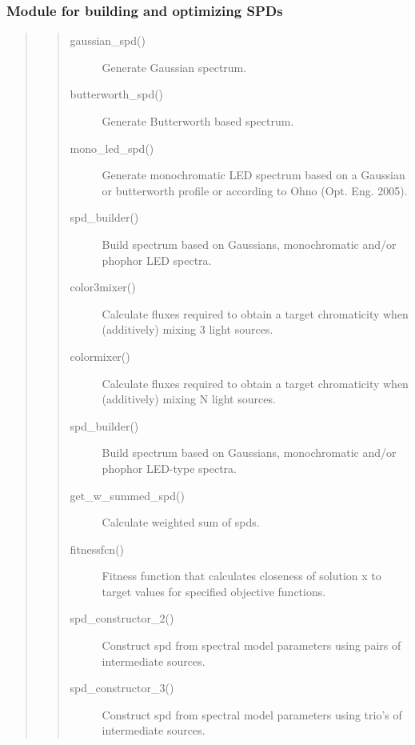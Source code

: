 \documentclass[letterpaper,10pt,english]{sphinxmanual}
\begin{document}
\subsubsection{Module for building and optimizing SPDs}
\label{\detokenize{toolboxes:module-for-building-and-optimizing-spds}}\begin{quote}
\begin{quote}\begin{description}
\item[{gaussian\_spd()}] \leavevmode
Generate Gaussian spectrum.

\item[{butterworth\_spd()}] \leavevmode
Generate Butterworth based spectrum.

\item[{mono\_led\_spd()}] \leavevmode
Generate monochromatic LED spectrum based on a Gaussian 
or butterworth profile or according to Ohno (Opt. Eng. 2005).

\item[{spd\_builder()}] \leavevmode
Build spectrum based on Gaussians, monochromatic 
and/or phophor LED spectra.

\item[{color3mixer()}] \leavevmode
Calculate fluxes required to obtain a target chromaticity 
when (additively) mixing 3 light sources.

\item[{colormixer()}] \leavevmode
Calculate fluxes required to obtain a target chromaticity 
when (additively) mixing N light sources.

\item[{spd\_builder()}] \leavevmode
Build spectrum based on Gaussians, monochromatic 
and/or phophor LED-type spectra.

\item[{get\_w\_summed\_spd()}] \leavevmode
Calculate weighted sum of spds.

\item[{fitnessfcn()}] \leavevmode
Fitness function that calculates closeness of solution x to 
target values for specified objective functions.

\item[{spd\_constructor\_2()}] \leavevmode
Construct spd from spectral model parameters 
using pairs of intermediate sources.

\item[{spd\_constructor\_3()}] \leavevmode
Construct spd from spectral model parameters 
using trio’s of intermediate sources.


\end{description}
\end{quote}
\end{quote}
\end{document}
